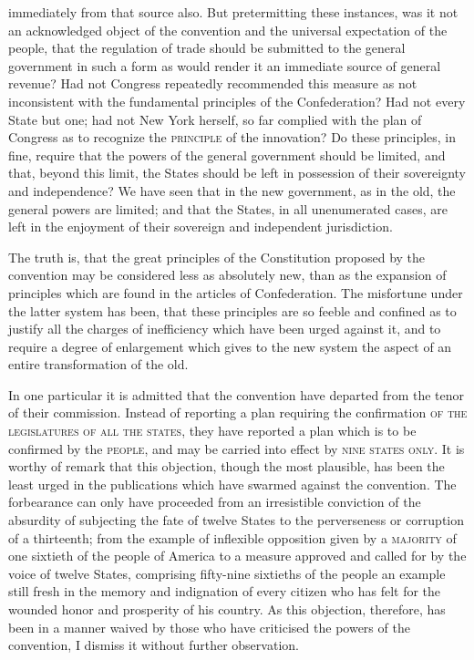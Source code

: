 immediately from that source also. But pretermitting these instances, was it not an acknowledged object of the convention and the universal expectation of the people, that the regulation of trade should be submitted to the general government in such a form as would render it an immediate source of general revenue? Had not Congress repeatedly recommended this measure as not inconsistent with the fundamental principles of the Confederation? Had not every State but one; had not New York herself, so far complied with the plan of Congress as to recognize the \textsc{principle} of the innovation? Do these principles, in fine, require that the powers of the general government should be limited, and that, beyond this limit, the States should be left in possession of their sovereignty and independence? We have seen that in the new government, as in the old, the general powers are limited; and that the States, in all unenumerated cases, are left in the enjoyment of their sovereign and independent jurisdiction.

The truth is, that the great principles of the Constitution proposed by the convention may be considered less as absolutely new, than as the expansion of principles which are found in the articles of Confederation. The misfortune under the latter system has been, that these principles are so feeble and confined as to justify all the charges of inefficiency which have been urged against it, and to require a degree of enlargement which gives to the new system the aspect of an entire transformation of the old.

In one particular it is admitted that the convention have departed from the tenor of their commission. Instead of reporting a plan requiring the confirmation \textsc{of the legislatures of all the states}, they have reported a plan which is to be confirmed by the \textsc{people}, and may be carried into effect by \textsc{nine states only}. It is worthy of remark that this objection, though the most plausible, has been the least urged in the publications which have swarmed against the convention. The forbearance can only have proceeded from an irresistible conviction of the absurdity of subjecting the fate of twelve States to the perverseness or corruption of a thirteenth; from the example of inflexible opposition given by a \textsc{majority} of one sixtieth of the people of America to a measure approved and called for by the voice of twelve States, comprising fifty-nine sixtieths of the people an example still fresh in the memory and indignation of every citizen who has felt for the wounded honor and prosperity of his country. As this objection, therefore, has been in a manner waived by those who have criticised the powers of the convention, I dismiss it without further observation.

